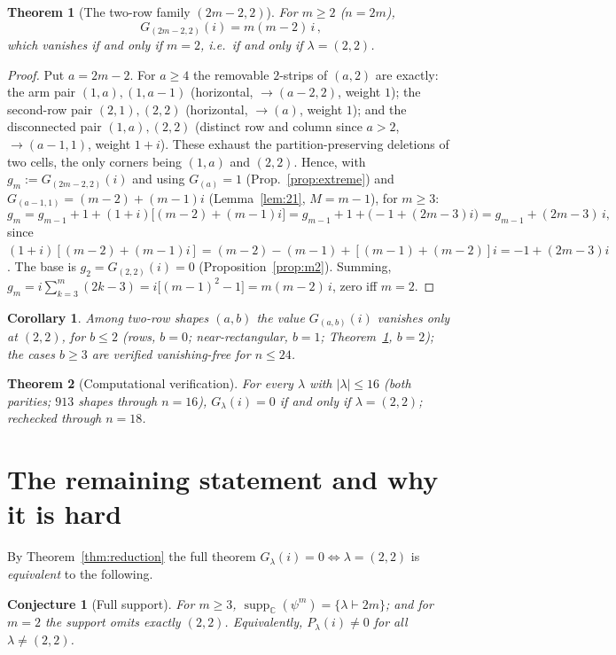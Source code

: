 \documentclass[11pt]{article}
\newtheorem{theorem}{Theorem}
\newtheorem{corollary}{Corollary}
\newtheorem{conjecture}{Conjecture}
\theoremstyle{definition}
\theoremstyle{remark}
\DeclareMathOperator{\supp}{supp}
\newcommand{\CC}{\mathbb{C}}
\newcommand{\la}{\lambda}
\begin{document}
\begin{theorem}[The two-row family $(2m-2,2)$]\label{thm:two}
For $m\ge2$ \emph{(}$n=2m$\emph{)},
\[
   \boxed{\,G_{(2m-2,2)}(i)=m(m-2)\,i\,},
\]
which vanishes \emph{if and only if} $m=2$, i.e.\ if and only if $\la=(2,2)$.
\end{theorem}
\begin{proof}
Put $a=2m-2$. For $a\ge4$ the removable $2$-strips of $(a,2)$ are exactly: the arm
pair $(1,a),(1,a-1)$ (horizontal, $\to(a-2,2)$, weight $1$); the second-row pair
$(2,1),(2,2)$ (horizontal, $\to(a)$, weight $1$); and the disconnected pair
$(1,a),(2,2)$ (distinct row and column since $a>2$, $\to(a-1,1)$, weight $1+i$).
These exhaust the partition-preserving deletions of two cells, the only corners being
$(1,a)$ and $(2,2)$. Hence, with $g_m:=G_{(2m-2,2)}(i)$ and using $G_{(a)}=1$
(Prop.~\ref{prop:extreme}) and $G_{(a-1,1)}=(m-2)+(m-1)i$ (Lemma~\ref{lem:21},
$M=m-1$), for $m\ge3$:
\[
   g_m=g_{m-1}+1+(1+i)\big[(m-2)+(m-1)i\big]
      =g_{m-1}+1+\big(-1+(2m-3)i\big)=g_{m-1}+(2m-3)\,i,
\]
since $(1+i)[(m-2)+(m-1)i]=(m-2)-(m-1)+[(m-1)+(m-2)]i=-1+(2m-3)i$. The base is
$g_2=G_{(2,2)}(i)=0$ (Proposition~\ref{prop:m2}). Summing,
$g_m=i\sum_{k=3}^m(2k-3)=i\big[(m-1)^2-1\big]=m(m-2)\,i$, zero iff $m=2$.
\end{proof}

\begin{corollary}\label{cor:two-row}
Among two-row shapes $(a,b)$ the value $G_{(a,b)}(i)$ vanishes only at $(2,2)$, for
$b\le2$ \emph{(}rows, $b{=}0$; near-rectangular, $b{=}1$; Theorem~\ref{thm:two},
$b{=}2$\emph{)}; the cases $b\ge3$ are verified vanishing-free for $n\le24$.
\end{corollary}

\begin{theorem}[Computational verification]\label{thm:comp}
For every $\la$ with $|\la|\le16$ (both parities; $913$ shapes through $n=16$),
$G_\la(i)=0$ if and only if $\la=(2,2)$; rechecked through $n=18$.
\end{theorem}

\section{The remaining statement and why it is hard}

By Theorem~\ref{thm:reduction} the full theorem $G_\la(i)=0\iff\la=(2,2)$ is
\emph{equivalent} to the following.

\begin{conjecture}[Full support]\label{conj:full}
For $m\ge3$, $\supp_\CC(\psi^m)=\{\la\vdash2m\}$; and for $m=2$ the support omits
exactly $(2,2)$. Equivalently, $P_\la(i)\neq0$ for all $\la\neq(2,2)$.
\end{conjecture}
\end{document}
